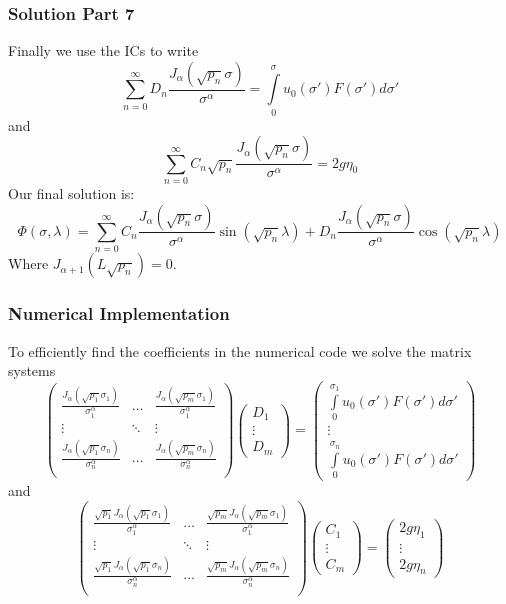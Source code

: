 	
	
	
		\begin{frame}
		\frametitle{Solution Part 7}
		Finally we use the ICs to write
		\[
		\sum_{n=0}^\infty D_n\frac{J_\alpha(\sqrt{p_n}\sigma)}{\sigma^\alpha}=\int\limits_0^\sigma u_0(\sigma ')F(\sigma ')d \sigma'
		\] and
		\[
		\sum_{n=0}^\infty C_n\sqrt{p_n}\frac{J_\alpha(\sqrt{p_n}\sigma)}{\sigma^\alpha} =2g\eta_0
		\]
		 Our final solution is:
				\[
		\Phi(\sigma,\lambda)=\sum_{n=0}^\infty C_n\frac{J_\alpha(\sqrt{p_n}\sigma)}{\sigma^\alpha} \sin(\sqrt{p_n}\lambda)+D_n\frac{J_\alpha(\sqrt{p_n}\sigma)}{\sigma^\alpha}\cos(\sqrt{p_n}\lambda)
		\]
		Where $J_{\alpha+1}(L\sqrt{p_n})=0$.
	\end{frame}
	
	
		\begin{frame}
		\frametitle{Numerical Implementation}
		To efficiently find the coefficients in the numerical code we solve the matrix systems
		\[
		\begin{pmatrix}
		\frac{J_\alpha(\sqrt{p_1}\sigma_1)}{\sigma_1^\alpha}&\ldots &\frac{J_\alpha(\sqrt{p_m}\sigma_1)}{\sigma_1^\alpha}\\
		\vdots&\ddots&\vdots\\
		\frac{J_\alpha(\sqrt{p_1}\sigma_n)}{\sigma_n^\alpha}&\ldots&\frac{J_\alpha(\sqrt{p_m}\sigma_n)}{\sigma_n^\alpha}\\
		\end{pmatrix}\begin{pmatrix}D_1\\\vdots\\D_m\end{pmatrix}=\begin{pmatrix} \int\limits_0^{\sigma_1} u_0(\sigma ')F(\sigma ')d \sigma'\\\vdots \\\int\limits_0^{\sigma_n} u_0(\sigma ')F(\sigma ')d \sigma' \end{pmatrix}
		\]
		and
				\[
		\begin{pmatrix}
		\frac{\sqrt{p_1}J_\alpha(\sqrt{p_1}\sigma_1)}{\sigma_1^\alpha}&\ldots &\frac{\sqrt{p_m}J_\alpha(\sqrt{p_m}\sigma_1)}{\sigma_1^\alpha}\\
		\vdots&\ddots&\vdots\\
		\frac{\sqrt{p_1}J_\alpha(\sqrt{p_1}\sigma_n)}{\sigma_n^\alpha}&\ldots&\frac{\sqrt{p_m}J_\alpha(\sqrt{p_m}\sigma_n)}{\sigma_n^\alpha}\\
		\end{pmatrix}\begin{pmatrix}C_1\\\vdots\\C_m\end{pmatrix}=\begin{pmatrix} 2g\eta_1\\\vdots \\2g\eta_n\end{pmatrix}
		\]
	\end{frame}
	

